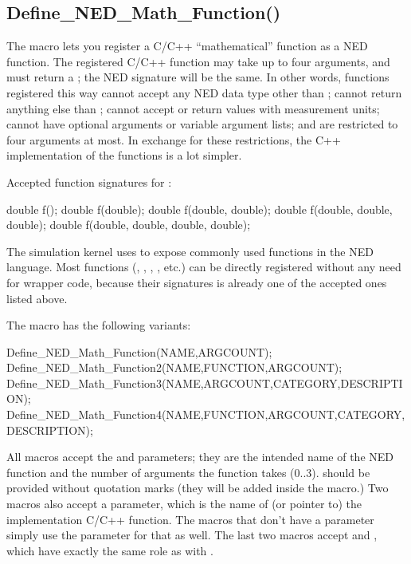 \subsection{Define\_NED\_Math\_Function()}
\label{sec:sim-lib:define-ned-math-function}

The  macro lets you register a C/C++
``mathematical'' function as a NED function. The registered C/C++ function
may take up to four  arguments, and must return a ;
the NED signature will be the same. In other words, functions registered
this way cannot accept any NED data type other than ; cannot
return anything else than ; cannot accept or return values with
measurement units; cannot have optional arguments or variable argument
lists; and are restricted to four arguments at most. In exchange for these
restrictions, the C++ implementation of the functions is a lot simpler.

Accepted function signatures for :

\begin{cpp}
double f();
double f(double);
double f(double, double);
double f(double, double, double);
double f(double, double, double, double);
\end{cpp}

The simulation kernel uses  to expose
commonly used  functions in the NED language. Most 
functions (, , , , etc.)
can be directly registered without any need for wrapper code, because their
signatures is already one of the accepted ones listed above.

The macro has the following variants:

\begin{cpp}
Define_NED_Math_Function(NAME,ARGCOUNT);
Define_NED_Math_Function2(NAME,FUNCTION,ARGCOUNT);
Define_NED_Math_Function3(NAME,ARGCOUNT,CATEGORY,DESCRIPTION);
Define_NED_Math_Function4(NAME,FUNCTION,ARGCOUNT,CATEGORY,DESCRIPTION);
\end{cpp}

All macros accept the  and  parameters; they are
the intended name of the NED function and the number of 
arguments the function takes (0..3).  should be provided without
quotation marks (they will be added inside the macro.) Two macros also
accept a  parameter, which is the name of (or pointer to) the
implementation C/C++ function. The macros that don't have a 
parameter simply use the  parameter for that as well. The last
two macros accept  and , which have exactly
the same role as with .

